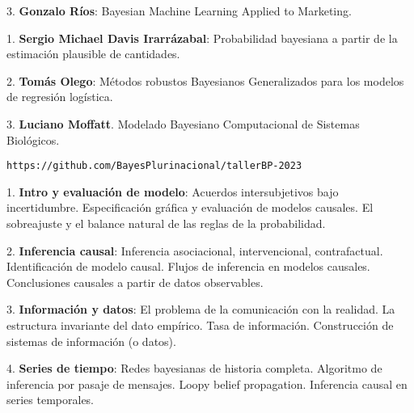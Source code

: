 \documentclass[a4paper,12pt]{article}
\begin{document}
{\hspace{0.6cm} 3. \textbf{Gonzalo Ríos}: Bayesian Machine Learning Applied to Marketing.


\justify \vspace{0.6cm}

\scalebox{1.2}{\Large Bloque 4}

\vspace{0.2cm}

\hspace{0.6cm} 1. \textbf{Sergio Michael Davis Irarrázabal}: Probabilidad bayesiana a partir de la estimación plausible de cantidades.

\hspace{0.6cm} 2. \textbf{Tomás Olego}: Métodos robustos Bayesianos Generalizados para los modelos de regresión logística.

\hspace{0.6cm} 3. \textbf{Luciano Moffatt}. Modelado Bayesiano  Computacional de Sistemas Biológicos.
}

\vspace{1cm}

\centering
\scalebox{1.7}{\Large Taller}

\texttt{https://github.com/BayesPlurinacional/tallerBP-2023}

\vspace{0.4cm}

\justify

 \small
\hspace{0.6cm} 1. \textbf{Intro y evaluación de modelo}: Acuerdos intersubjetivos bajo incertidumbre. Especificación gráfica y evaluación de modelos causales. El sobreajuste y el balance natural de las reglas de la probabilidad.

\hspace{0.6cm} 2. \textbf{Inferencia causal}: Inferencia asociacional, intervencional, contrafactual. Identificación de modelo causal. Flujos de inferencia en modelos causales. Conclusiones causales a partir de datos observables.

\hspace{0.6cm} 3. \textbf{Información y datos}: El problema de la comunicación con la realidad. La estructura invariante del dato empírico. Tasa de información. Construcción de sistemas de información (o datos).

\hspace{0.6cm} 4. \textbf{Series de tiempo}: Redes bayesianas de historia completa. Algoritmo de inferencia por pasaje de mensajes. Loopy belief propagation. Inferencia causal en series temporales.
\end{document}

